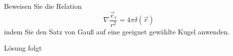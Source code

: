 \documentclass{atistandalonetask}
\begin{document}
  \begin{atiTask}[
    title = Eine häufig gebrauchte Erkenntnis
  ]
  
 Beweisen Sie die Relation
    \[
    \nabla \frac{\vec{e}_r}{r^2}=4\pi\delta(\vec{r})
    \]
    indem Sie den Satz von Gauß auf eine geeignet gewählte Kugel anwenden.
  \end{atiTask}
  \begin{atiSolution}
   	Lösung folgt
  \end{atiSolution}
\end{document}
